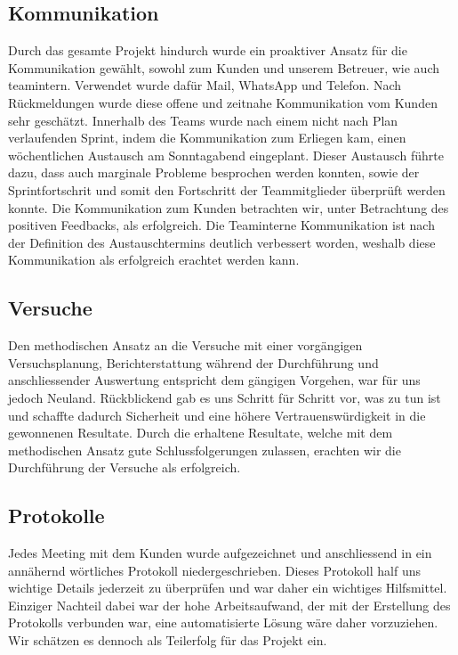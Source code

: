 \subsection{Kommunikation}
Durch das gesamte Projekt hindurch wurde ein proaktiver Ansatz für die Kommunikation gewählt, sowohl zum Kunden und unserem Betreuer, wie auch teamintern. Verwendet wurde dafür Mail, WhatsApp und Telefon. Nach Rückmeldungen wurde diese offene und zeitnahe Kommunikation vom Kunden sehr geschätzt. Innerhalb des Teams wurde nach einem nicht nach Plan verlaufenden Sprint, indem die Kommunikation zum Erliegen kam, einen wöchentlichen Austausch am Sonntagabend eingeplant. Dieser Austausch führte dazu, dass auch marginale Probleme besprochen werden konnten, sowie der Sprintfortschrit und somit den Fortschritt der Teammitglieder überprüft werden konnte. Die Kommunikation zum Kunden betrachten wir, unter Betrachtung des positiven Feedbacks, als erfolgreich. Die Teaminterne Kommunikation ist nach der Definition des Austauschtermins deutlich verbessert worden, weshalb diese Kommunikation als erfolgreich erachtet werden kann.

\subsection{Versuche}
Den methodischen Ansatz an die Versuche mit einer vorgängigen Versuchsplanung, Berichterstattung während der Durchführung und anschliessender Auswertung entspricht dem gängigen Vorgehen, war für uns jedoch Neuland. Rückblickend gab es uns Schritt für Schritt vor, was zu tun ist und schaffte dadurch Sicherheit und eine höhere Vertrauenswürdigkeit in die gewonnenen Resultate. Durch die erhaltene Resultate, welche mit dem methodischen Ansatz gute Schlussfolgerungen zulassen, erachten wir die Durchführung der Versuche als erfolgreich.

\subsection{Protokolle}
Jedes Meeting mit dem Kunden wurde aufgezeichnet und anschliessend in ein annähernd wörtliches Protokoll niedergeschrieben. Dieses Protokoll half uns wichtige Details jederzeit zu überprüfen und war daher ein wichtiges Hilfsmittel. Einziger Nachteil dabei war der hohe Arbeitsaufwand, der mit der Erstellung des Protokolls verbunden war, eine automatisierte Lösung wäre daher vorzuziehen. Wir schätzen es dennoch als Teilerfolg für das Projekt ein.
